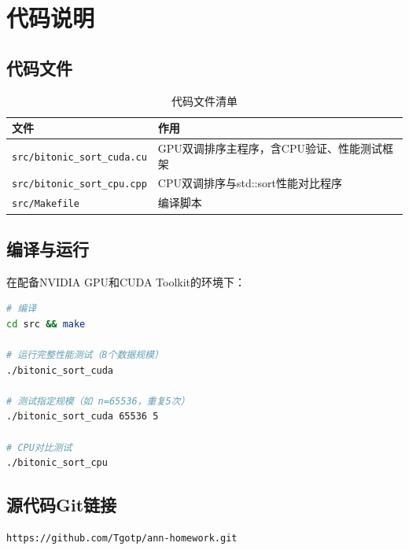 \documentclass[UTF8,a4paper,10pt]{ctexart}
\begin{document}
\newpage
\appendix

\section{代码说明}

\subsection{代码文件}

\begin{table}[H]
\centering
\caption{代码文件清单}
\label{tab:code_files}
\begin{tabular}{ll}
\toprule
文件 & 作用 \\
\midrule
\texttt{src/bitonic\_sort\_cuda.cu} & GPU双调排序主程序，含CPU验证、性能测试框架 \\
\texttt{src/bitonic\_sort\_cpu.cpp} & CPU双调排序与std::sort性能对比程序 \\
\texttt{src/Makefile} & 编译脚本 \\
\bottomrule
\end{tabular}
\end{table}

\subsection{编译与运行}

在配备NVIDIA GPU和CUDA Toolkit的环境下：

\begin{lstlisting}[language=bash]
# 编译
cd src && make

# 运行完整性能测试（8个数据规模）
./bitonic_sort_cuda

# 测试指定规模（如 n=65536，重复5次）
./bitonic_sort_cuda 65536 5

# CPU对比测试
./bitonic_sort_cpu
\end{lstlisting}

\subsection{源代码Git链接}

\begin{lstlisting}
https://github.com/Tgotp/ann-homework.git
\end{lstlisting}
\end{document}
